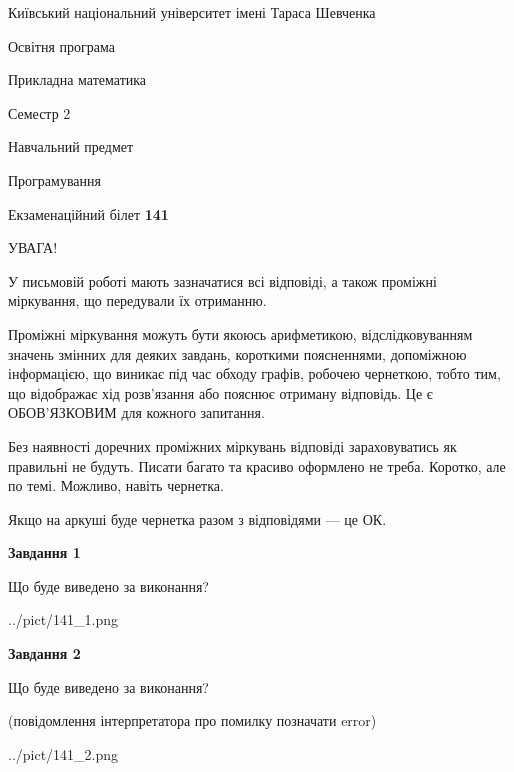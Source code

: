 \documentclass[12pt, ukrainian]{article}
\begin{document}
{{\begin {small}\par
{ \center  Київський національний університет імені Тараса Шевченка \par}
{\parbox {5 cm}{Освітня програма \hfill}{\parbox {7 cm}{Прикладна математика\hfill}}\parbox {6 cm}{\hfill Семестр 2}}\par
{\parbox {5 cm} {Навчальний предмет \hfill}\parbox {7 cm}{Програмування \hfill}\parbox {6cm}{\hfill}\par}\vspace{-7pt} \end{small}}{\center Екзаменаційний білет \No \textbf
{ 141 }\par}}
{
\begin {large}
УВАГА!

У письмовій роботі мають зазначатися всі відповіді, а також проміжні міркування, що передували їх отриманню.

Проміжні міркування можуть бути якоюсь арифметикою, відслідковуванням зна\-чень змінних для деяких завдань,
короткими поясненнями, допоміжною інформацією, що виникає під час обходу графів, робочею чернеткою,
тобто тим, що відображає хід розв’язання або пояснює отриману відповідь.
Це є ОБОВ’ЯЗКОВИМ для кожного запитання.

Без наявності доречних проміжних міркувань відповіді зараховуватись як правиль\-ні не будуть.
Писати багато та красиво оформлено не треба. Коротко, але по темі. Можли\-во, навіть чернетка.

Якщо на аркуші буде чернетка разом з відповідями --- це ОК.

\newpage

{\begin {center}\textbf{Завдання 1}\end {center}}\par
Що буде виведено за виконання?\par
\begin{center}
	{../pict/141_1.png}
\end{center}
\newpage

{\begin {center}\textbf{Завдання 2}\end {center}}\par
Що буде виведено за виконання?\par
 (повідомлення інтерпретатора про помилку позначати error)\par
\begin{center}
	{../pict/141_2.png}
\end{center}
\newpage


\end{large}}
\end{document}
